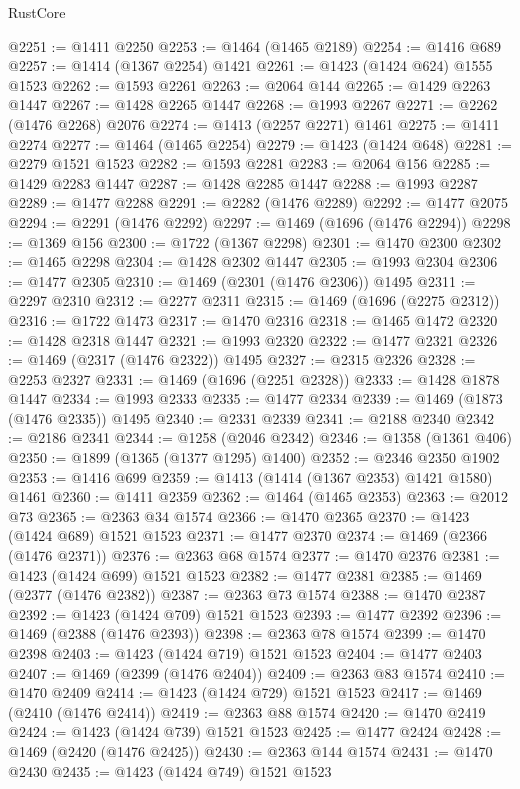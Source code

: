 \begin{lexlean}{RustCore}
\begin{coremodule}
{\begin{coremodule}
{{{{{{{{{{{{{{{{{{{{{{{{{{{{{{{{{{{{{{{{{{{{{{{@2251 := @1411 @2250
@2253 := @1464 (@1465 @2189)
@2254 := @1416 @689
@2257 := @1414 (@1367 @2254) @1421
@2261 := @1423 (@1424 @624) @1555 @1523
@2262 := @1593 @2261
@2263 := @2064 @144
@2265 := @1429 @2263 @1447
@2267 := @1428 @2265 @1447
@2268 := @1993 @2267
@2271 := @2262 (@1476 @2268) @2076
@2274 := @1413 (@2257 @2271) @1461
@2275 := @1411 @2274
@2277 := @1464 (@1465 @2254)
@2279 := @1423 (@1424 @648)
@2281 := @2279 @1521 @1523
@2282 := @1593 @2281
@2283 := @2064 @156
@2285 := @1429 @2283 @1447
@2287 := @1428 @2285 @1447
@2288 := @1993 @2287
@2289 := @1477 @2288
@2291 := @2282 (@1476 @2289)
@2292 := @1477 @2075
@2294 := @2291 (@1476 @2292)
@2297 := @1469 (@1696 (@1476 @2294))
@2298 := @1369 @156
@2300 := @1722 (@1367 @2298)
@2301 := @1470 @2300
@2302 := @1465 @2298
@2304 := @1428 @2302 @1447
@2305 := @1993 @2304
@2306 := @1477 @2305
@2310 := @1469 (@2301 (@1476 @2306)) @1495
@2311 := @2297 @2310
@2312 := @2277 @2311
@2315 := @1469 (@1696 (@2275 @2312))
@2316 := @1722 @1473
@2317 := @1470 @2316
@2318 := @1465 @1472
@2320 := @1428 @2318 @1447
@2321 := @1993 @2320
@2322 := @1477 @2321
@2326 := @1469 (@2317 (@1476 @2322)) @1495
@2327 := @2315 @2326
@2328 := @2253 @2327
@2331 := @1469 (@1696 (@2251 @2328))
@2333 := @1428 @1878 @1447
@2334 := @1993 @2333
@2335 := @1477 @2334
@2339 := @1469 (@1873 (@1476 @2335)) @1495
@2340 := @2331 @2339
@2341 := @2188 @2340
@2342 := @2186 @2341
@2344 := @1258 (@2046 @2342)
@2346 := @1358 (@1361 @406)
@2350 := @1899 (@1365 (@1377 @1295) @1400)
@2352 := @2346 @2350 @1902
@2353 := @1416 @699
@2359 := @1413 (@1414 (@1367 @2353) @1421 @1580) @1461
@2360 := @1411 @2359
@2362 := @1464 (@1465 @2353)
@2363 := @2012 @73
@2365 := @2363 @34 @1574
@2366 := @1470 @2365
@2370 := @1423 (@1424 @689) @1521 @1523
@2371 := @1477 @2370
@2374 := @1469 (@2366 (@1476 @2371))
@2376 := @2363 @68 @1574
@2377 := @1470 @2376
@2381 := @1423 (@1424 @699) @1521 @1523
@2382 := @1477 @2381
@2385 := @1469 (@2377 (@1476 @2382))
@2387 := @2363 @73 @1574
@2388 := @1470 @2387
@2392 := @1423 (@1424 @709) @1521 @1523
@2393 := @1477 @2392
@2396 := @1469 (@2388 (@1476 @2393))
@2398 := @2363 @78 @1574
@2399 := @1470 @2398
@2403 := @1423 (@1424 @719) @1521 @1523
@2404 := @1477 @2403
@2407 := @1469 (@2399 (@1476 @2404))
@2409 := @2363 @83 @1574
@2410 := @1470 @2409
@2414 := @1423 (@1424 @729) @1521 @1523
@2417 := @1469 (@2410 (@1476 @2414))
@2419 := @2363 @88 @1574
@2420 := @1470 @2419
@2424 := @1423 (@1424 @739) @1521 @1523
@2425 := @1477 @2424
@2428 := @1469 (@2420 (@1476 @2425))
@2430 := @2363 @144 @1574
@2431 := @1470 @2430
@2435 := @1423 (@1424 @749) @1521 @1523
}}}}}}}}}}}}}}}}}}}}}}}}}}}}}}}}}}}}}}}}}}}}}}}
\end{coremodule}}
\end{coremodule}
\end{lexlean}
